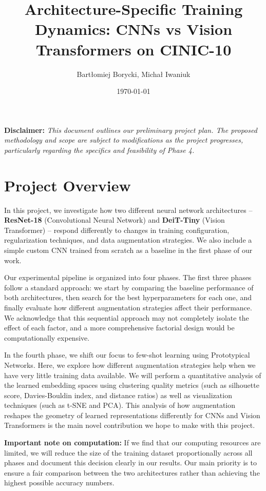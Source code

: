 \documentclass[12pt,a4paper]{article}
\title{\textbf{Architecture-Specific Training Dynamics: CNNs vs Vision Transformers on CINIC-10}}
\author{Bart\l{}omiej Borycki, Micha\l{} Iwaniuk}
\date{\today}
\begin{document}
\maketitle

\textbf{Disclaimer:} \textit{This document outlines our preliminary project plan. The proposed methodology and scope are subject to modifications as the project progresses, particularly regarding the specifics and feasibility of Phase 4.}

\section{Project Overview}

In this project, we investigate how two different neural network architectures -- \textbf{ResNet-18} (Convolutional Neural Network) and \textbf{DeiT-Tiny} (Vision Transformer) -- respond differently to changes in training configuration, regularization techniques, and data augmentation strategies. We also include a simple custom CNN trained from scratch as a baseline in the first phase of our work.

Our experimental pipeline is organized into four phases. The first three phases follow a standard approach: we start by comparing the baseline performance of both architectures, then search for the best hyperparameters for each one, and finally evaluate how different augmentation strategies affect their performance. We acknowledge that this sequential approach may not completely isolate the effect of each factor, and a more comprehensive factorial design would be computationally expensive.

In the fourth phase, we shift our focus to few-shot learning using Prototypical Networks. Here, we explore how different augmentation strategies help when we have very little training data available. We will perform a quantitative analysis of the learned embedding spaces using clustering quality metrics (such as silhouette score, Davies-Bouldin index, and distance ratios) as well as visualization techniques (such as t-SNE and PCA). This analysis of how augmentation reshapes the geometry of learned representations differently for CNNs and Vision Transformers is the main novel contribution we hope to make with this project.

\textbf{Important note on computation:} If we find that our computing resources are limited, we will reduce the size of the training dataset proportionally across all phases and document this decision clearly in our results. Our main priority is to ensure a fair comparison between the two architectures rather than achieving the highest possible accuracy numbers.
\end{document}
